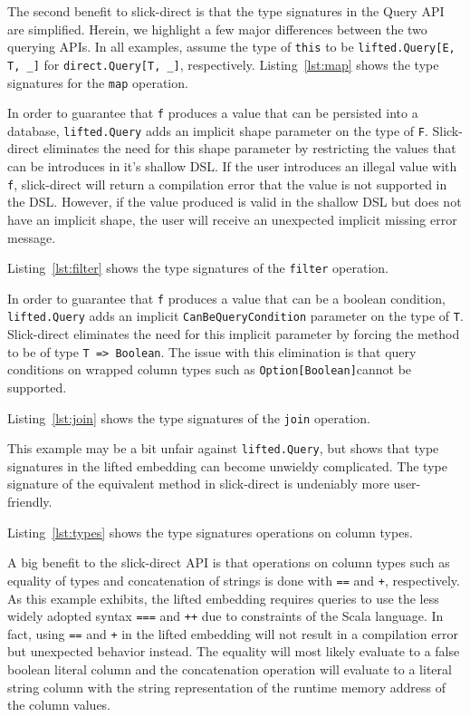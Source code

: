 The second benefit to slick-direct is that the type signatures in the Query API are simplified.
Herein, we highlight a few major differences between the two querying APIs.
In all examples, assume the type of \texttt{this} to be \texttt{lifted.Query[E, T, \_]} for \texttt{direct.Query[T, \_]}, respectively.
Listing~\ref{lst:map} shows the type signatures for the \texttt{map} operation.

In order to guarantee that \texttt{f} produces a value that can be persisted into a database, \texttt{lifted.Query} adds an implicit shape parameter on the type of \texttt{F}.
Slick-direct eliminates the need for this shape parameter by restricting the values that can be introduces in it's shallow DSL.
If the user introduces an illegal value with \texttt{f}, slick-direct will return a compilation error that the value is not supported in the DSL.
However, if the value produced is valid in the shallow DSL but does not have an implicit shape, the user will receive an unexpected implicit missing error message.

Listing~\ref{lst:filter} shows the type signatures of the \texttt{filter} operation.

In order to guarantee that \texttt{f} produces a value that can be a boolean condition, \texttt{lifted.Query} adds an implicit \texttt{CanBeQueryCondition} parameter on the type of \texttt{T}.
Slick-direct eliminates the need for this implicit parameter by forcing the method to be of type \texttt{T => Boolean}.
The issue with this elimination is that query conditions on wrapped column types such as \texttt{Option[Boolean]}cannot be supported.

Listing~\ref{lst:join} shows the type signatures of the \texttt{join} operation.

This example may be a bit unfair against \texttt{lifted.Query}, but shows that type signatures in the lifted embedding can become unwieldy complicated.
The type signature of the equivalent method in slick-direct is undeniably more user-friendly.

Listing~\ref{lst:types} shows the type signatures operations on column types.

A big benefit to the slick-direct API is that operations on column types such as equality of types and concatenation of strings is done with \texttt{==} and \texttt{+}, respectively.
As this example exhibits, the lifted embedding requires queries to use the less widely adopted syntax \texttt{===} and \texttt{++} due to constraints of the Scala language.
In fact, using \texttt{==} and \texttt{+} in the lifted embedding will not result in a compilation error but unexpected behavior instead.
The equality will most likely evaluate to a false boolean literal column and the concatenation operation will evaluate to a literal string column with the string representation of the runtime memory address of the column values.

